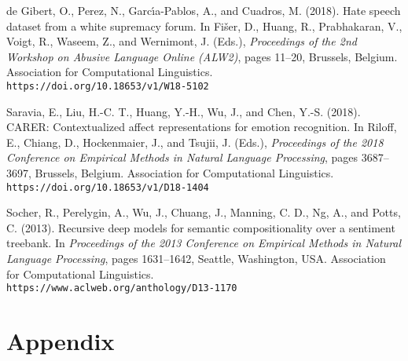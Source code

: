 \documentclass[twocolumn]{article}
\begin{document}




de Gibert, O., Perez, N., Garc{\'\i}a-Pablos, A., and Cuadros, M. (2018).
Hate speech dataset from a white supremacy forum.
In Fi{\v{s}}er, D., Huang, R., Prabhakaran, V., Voigt, R., Waseem, Z., and Wernimont, J. (Eds.),
\textit{Proceedings of the 2nd Workshop on Abusive Language Online (ALW2)}, pages 11--20, Brussels, Belgium.
Association for Computational Linguistics. \\
\texttt{https://doi.org/10.18653/v1/W18-5102}

Saravia, E., Liu, H.-C. T., Huang, Y.-H., Wu, J., and Chen, Y.-S. (2018).
CARER: Contextualized affect representations for emotion recognition.
In Riloff, E., Chiang, D., Hockenmaier, J., and Tsujii, J. (Eds.),
\textit{Proceedings of the 2018 Conference on Empirical Methods in Natural Language Processing}, pages 3687--3697, Brussels, Belgium.
Association for Computational Linguistics. \\
\texttt{https://doi.org/10.18653/v1/D18-1404}


Socher, R., Perelygin, A., Wu, J., Chuang, J., Manning, C. D., Ng, A., and Potts, C. (2013).
Recursive deep models for semantic compositionality over a sentiment treebank.
In \textit{Proceedings of the 2013 Conference on Empirical Methods in Natural Language Processing}, pages 1631--1642, Seattle, Washington, USA.
Association for Computational Linguistics. \\
\texttt{https://www.aclweb.org/anthology/D13-1170}


\section{Appendix}

\twocolumn
\end{document}
